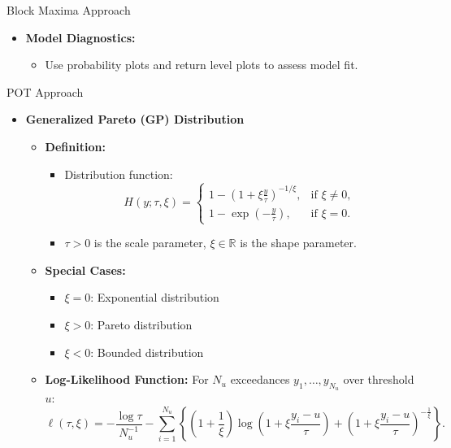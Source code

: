 \documentclass[10pt, hyperref={colorlinks = true,linkcolor = blue}]{beamer}
\begin{document}
{{\begin{frame}{Block Maxima Approach}
\begin{itemize}
\begin{itemize}
        \item \textbf{Model Diagnostics:}
        \begin{itemize}
            \item Use probability plots and return level plots to assess model fit.
        \end{itemize}
    \end{itemize}
\end{itemize}

\end{frame}


\begin{frame}{POT Approach}
\begin{itemize}
    \item \textbf{Generalized Pareto (GP) Distribution}
    \begin{itemize}
        \item \textbf{Definition:}
        \begin{itemize}
            \item Distribution function: 
            \[
            H(y; \tau, \xi) =
            \begin{cases}
                1 - \left(1 + \xi \frac{y}{\tau}\right)^{-1/\xi}, & \text{if } \xi \neq 0, \\
                1 - \exp\left(-\frac{y}{\tau}\right), & \text{if } \xi = 0.
            \end{cases}
            \]
            \item \(\tau > 0\) is the scale parameter, \(\xi \in \mathbb{R}\) is the shape parameter.
        \end{itemize}
        
        \item \textbf{Special Cases:}
        \begin{itemize}
            \item \(\xi = 0\): Exponential distribution
            \item \(\xi > 0\): Pareto distribution
            \item \(\xi < 0\): Bounded distribution
        \end{itemize}
        
        \item \textbf{Log-Likelihood Function:}
         For \(N_u\) exceedances \(y_1, \ldots, y_{N_u}\) over threshold \(u\):
            \[
            \ell(\tau, \xi) = - \frac{\log \tau}{N_u^{-1}} 
            - 
            \sum_{i=1}^{N_u} \left\{\left(1 + \frac{1}{\xi}\right)  \log \left(1 + \xi \frac{y_i - u}{\tau}\right)
            + \left(1 + \xi \frac{y_i - u}{\tau}\right)^{-\frac{1}{\xi}}\right\}.
            \]
        

\end{itemize}
\end{itemize}
\end{frame}}}
\end{document}

